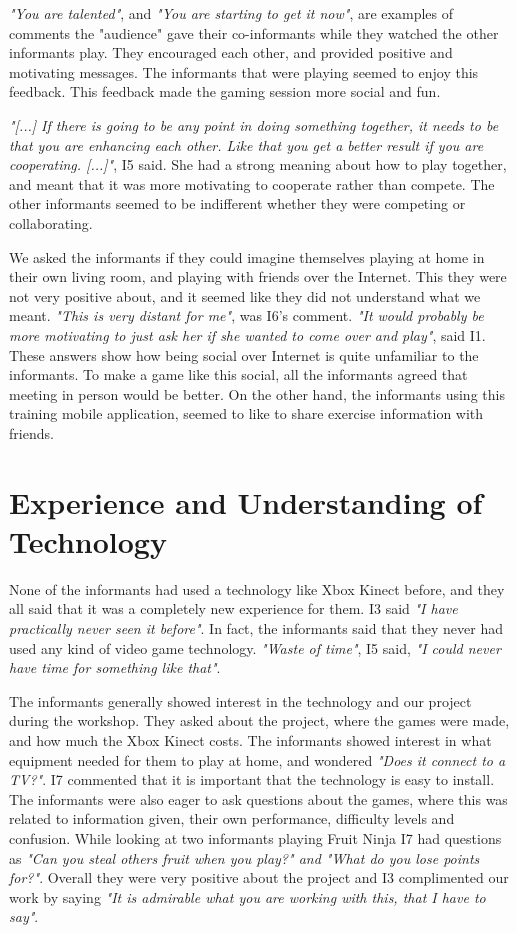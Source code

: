 \emph{"You are talented"}, and \emph{"You are starting to get it now"}, are examples of comments the "audience" gave their co-informants while they watched the other informants play. They encouraged each other, and provided positive and motivating messages. The informants that were playing seemed to enjoy this feedback. This feedback made the gaming session more social and fun.  

\emph{"[...] If there is going to be any point in doing something together, it needs to be that you are enhancing each other. Like that you get a better result if you are cooperating. [...]"}, I5 said. She had a strong meaning about how to play together, and meant that it was more motivating to cooperate rather than compete. The other informants seemed to be indifferent whether they were competing or collaborating.

We asked the informants if they could imagine themselves playing at home in their own living room, and playing with friends over the Internet. This they were not very positive about, and it seemed like they did not understand what we meant. \emph{"This is very distant for me"}, was I6's comment. \emph{"It would probably be more motivating to just ask her if she wanted to come over and play"}, said I1. These answers show how being social over Internet is quite unfamiliar to the informants. To make a game like this social, all the informants agreed that meeting in person would be better. On the other hand, the informants using this training mobile application, seemed to like to share exercise information with friends.

\section{Experience and Understanding of Technology}
None of the informants had used a technology like Xbox Kinect before, and they all said that it was a completely new experience for them. I3 said \emph{"I have practically never seen it before"}. In fact, the informants said that they never had used any kind of video game technology. \emph{"Waste of time"}, I5 said, \emph{"I could never have time for something like that"}.  

The informants generally showed interest in the technology and our project during the workshop. They asked about the project, where the games were made, and how much the Xbox Kinect costs. The informants showed interest in what equipment needed for them to play at home, and wondered  \emph{"Does it connect to a TV?"}. I7 commented that it is important that the technology is easy to install. The informants were also eager to ask questions about the games, where this was related to information given, their own performance, difficulty levels and confusion. While looking at two informants playing Fruit Ninja I7 had questions as \emph{"Can you steal others fruit when you play?" and "What do you lose points for?"}. Overall they were very positive about the project and I3 complimented our work by saying \emph{"It is admirable what you are working with this, that I have to say"}. 


